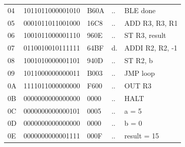 \begin{tcolorbox}[stepbox, title={Instruction 26 \hfill ticks 76 to 78 \quad BLE done}]
{\begin{tabular}{@{}lllll@{}}
04 & 1011011000001010 & B60A & .. & BLE done\\
05 & 0001011011001000 & 16C8 & .. & ADD R3, R3, R1\\
06 & 1001011000001110 & 960E & .. & ST R3, result\\
07 & 0110010010111111 & 64BF & d. & ADDI R2, R2, -1\\
08 & 1001010000001101 & 940D & .. & ST R2, b\\
09 & 1011000000000011 & B003 & .. & JMP loop\\
\rowcolor{pcc}0A & 1111011000000000 & F600 & .. & OUT R3\\
0B & 0000000000000000 & 0000 & .. & HALT\\
\rowcolor{datac}0C & 0000000000000101 & 0005 & .. & a = 5\\
\rowcolor{datac}0D & 0000000000000000 & 0000 & .. & b = 0\\
\rowcolor{datac}0E & 0000000000001111 & 000F & .. & result = 15\\
\end{tabular}}
\end{tcolorbox}\par\vspace{3pt}
